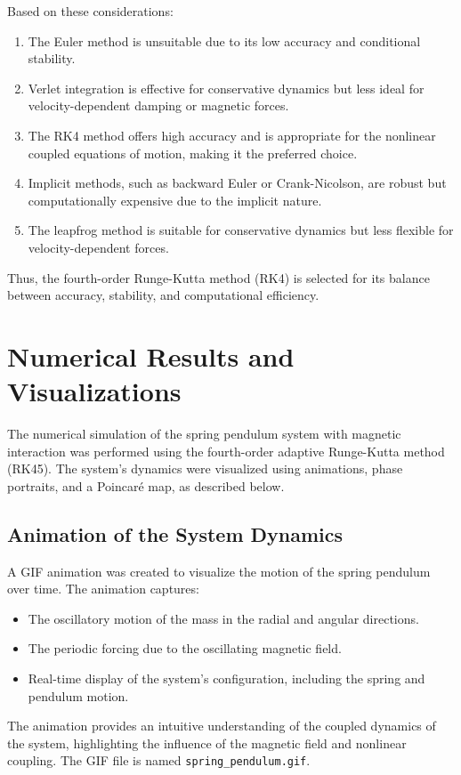 \documentclass[12pt]{article}
\begin{document}
Based on these considerations:
\begin{enumerate}
    \item The Euler method is unsuitable due to its low accuracy and conditional stability.
    \item Verlet integration is effective for conservative dynamics but less ideal for velocity-dependent damping or magnetic forces.
    \item The RK4 method offers high accuracy and is appropriate for the nonlinear coupled equations of motion, making it the preferred choice.
    \item Implicit methods, such as backward Euler or Crank-Nicolson, are robust but computationally expensive due to the implicit nature.
    \item The leapfrog method is suitable for conservative dynamics but less flexible for velocity-dependent forces.
\end{enumerate}

Thus, the fourth-order Runge-Kutta method (RK4) is selected for its balance between accuracy, stability, and computational efficiency.

\section{Numerical Results and Visualizations}

The numerical simulation of the spring pendulum system with magnetic interaction was performed using the fourth-order adaptive Runge-Kutta method (RK45). The system's dynamics were visualized using animations, phase portraits, and a Poincaré map, as described below.

\subsection{Animation of the System Dynamics}
A GIF animation was created to visualize the motion of the spring pendulum over time. The animation captures:
\begin{itemize}
    \item The oscillatory motion of the mass in the radial and angular directions.
    \item The periodic forcing due to the oscillating magnetic field.
    \item Real-time display of the system's configuration, including the spring and pendulum motion.
\end{itemize}
The animation provides an intuitive understanding of the coupled dynamics of the system, highlighting the influence of the magnetic field and nonlinear coupling. The GIF file is named \texttt{spring\_pendulum.gif}.
\end{document}
